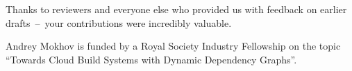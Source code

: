 \documentclass[acmsmall,screen]{acmart}\settopmatter{}
\begin{document}
\begin{acks}
  Thanks to reviewers and everyone else who provided us with feedback on
  earlier drafts~--~your contributions were incredibly valuable.

  Andrey Mokhov is funded by a Royal Society Industry Fellowship on the topic
  ``Towards Cloud Build Systems with Dynamic Dependency Graphs''.
\end{acks}



% 
\end{document}
